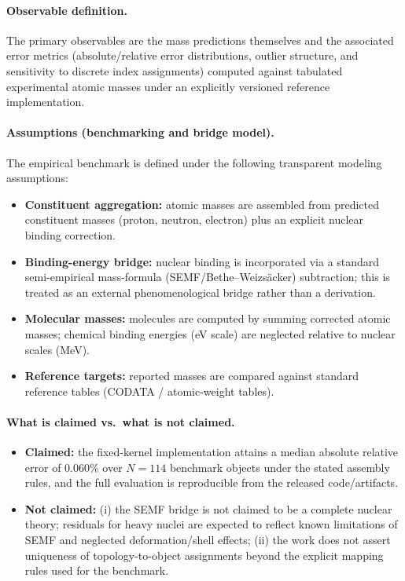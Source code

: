 \documentclass[11pt,a4paper]{article}
\begin{document}
\paragraph{Observable definition.}
The primary observables are the mass predictions themselves and the associated error metrics (absolute/relative error distributions, outlier structure, and sensitivity to discrete index assignments) computed against tabulated experimental atomic masses under an explicitly versioned reference implementation.

\paragraph{Assumptions (benchmarking and bridge model).}
The empirical benchmark is defined under the following transparent modeling assumptions:
\begin{itemize}
  \item \textbf{Constituent aggregation:} atomic masses are assembled from predicted constituent masses (proton, neutron, electron) plus an explicit nuclear binding correction.
  \item \textbf{Binding-energy bridge:} nuclear binding is incorporated via a standard semi-empirical mass-formula (SEMF/Bethe--Weizs\"acker) subtraction; this is treated as an external phenomenological bridge rather than a derivation.
  \item \textbf{Molecular masses:} molecules are computed by summing corrected atomic masses; chemical binding energies (eV scale) are neglected relative to nuclear scales (MeV).
  \item \textbf{Reference targets:} reported masses are compared against standard reference tables (CODATA / atomic-weight tables).
\end{itemize}

\paragraph{What is claimed vs.\ what is not claimed.}
\begin{itemize}
  \item \textbf{Claimed:} the fixed-kernel implementation attains a median absolute relative error of $0.060\%$ over $N=114$ benchmark objects under the stated assembly rules, and the full evaluation is reproducible from the released code/artifacts.
  \item \textbf{Not claimed:} (i) the SEMF bridge is not claimed to be a complete nuclear theory; residuals for heavy nuclei are expected to reflect known limitations of SEMF and neglected deformation/shell effects; (ii) the work does not assert uniqueness of topology-to-object assignments beyond the explicit mapping rules used for the benchmark.
\end{itemize}
\end{document}
